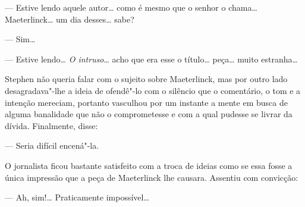 --- Estive lendo aquele autor\ldots{} como é mesmo que o senhor o
chama\ldots{} Maeterlinck\ldots{} um dia desses\ldots{} sabe?		

--- Sim\ldots{}

--- Estive lendo\ldots{} \textit{O intruso}\ldots{} acho que era esse o
título\ldots{} peça\ldots{} muito estranha\ldots{}

Stephen não queria falar com o sujeito sobre Maeterlinck, mas por
outro lado desagradava"-lhe a ideia de ofendê"-lo com o silêncio que o
comentário, o tom e a intenção mereciam, portanto vasculhou por um
instante a mente em busca de alguma banalidade que não o comprometesse
e com a qual pudesse se livrar da dívida.  Finalmente, disse:

--- Seria difícil encená"-la.

O jornalista ficou bastante satisfeito com a troca de ideias como se
essa fosse a única impressão que a peça de Maeterlinck lhe causara.
Assentiu com convicção:

--- Ah, sim!\ldots{} Praticamente impossível\ldots{}

